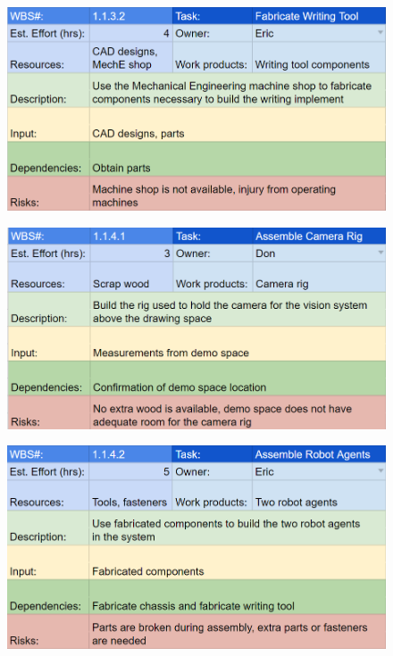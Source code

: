 \begin{figure}[h!]
\centering
\includegraphics[width=0.98\columnwidth]{wbs_schedule/wbs_dict_hw4.PNG}
\label{fig:hw4}
\end{figure}
\begin{figure}[h!]
\centering
\includegraphics[width=0.98\columnwidth]{wbs_schedule/wbs_dict_hw5.PNG}
\label{fig:hw5}
\end{figure}
\begin{figure}[h!]
\centering
\includegraphics[width=0.98\columnwidth]{wbs_schedule/wbs_dict_hw6.PNG}
\label{fig:hw6}
\end{figure}
